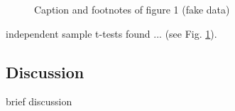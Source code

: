 \begin{figure}[h]
    \captionsetup{justification=justified, labelfont=bf, font=footnotesize, singlelinecheck = false, labelsep=period}
    \caption[Figure Name Shown on the List of Figures]{Caption and footnotes of figure 1 (fake data)}
    \label{fig: Study 1, DV1-2}
\end{figure}

independent sample t-tests found ... (see Fig. \ref{fig: Study 1, DV1-2}). 

\subsection{Discussion}

brief discussion